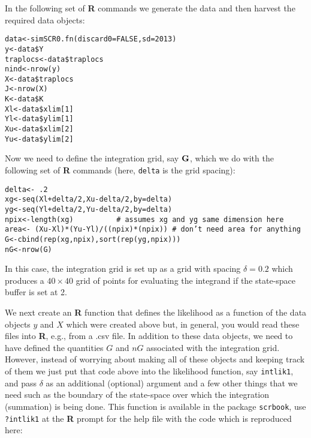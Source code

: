 In the following set of {\bf R} commands we generate the data and 
then harvest the required data objects:
{\small
\begin{verbatim}
data<-simSCR0.fn(discard0=FALSE,sd=2013)
y<-data$Y
traplocs<-data$traplocs
nind<-nrow(y)
X<-data$traplocs
J<-nrow(X)
K<-data$K
Xl<-data$xlim[1]
Yl<-data$ylim[1]
Xu<-data$xlim[2]
Yu<-data$ylim[2]
\end{verbatim}
}
Now we need to define the integration grid, say ${\bf G}$, which we do with
the following set of {\bf R} commands (here, \mbox{\tt delta} is the grid spacing):
{\small
\begin{verbatim}
delta<- .2
xg<-seq(Xl+delta/2,Xu-delta/2,by=delta) 
yg<-seq(Yl+delta/2,Yu-delta/2,by=delta) 
npix<-length(xg)          # assumes xg and yg same dimension here
area<- (Xu-Xl)*(Yu-Yl)/((npix)*(npix)) # don’t need area for anything
G<-cbind(rep(xg,npix),sort(rep(yg,npix)))
nG<-nrow(G)
\end{verbatim}
}
In this case, the integration grid is set up as a grid with spacing
$\delta = 0.2$ which produces a $40 \times 40$ grid of points for evaluating the
integrand if the state-space buffer is set at 2.

We next create an {\bf R} function that defines the likelihood as a function
of the data objects $y$ and $X$ which were created above but, in general,
you would read these files into {\bf R}, e.g., from a .csv file.
In addition to these data
objects, we need to have defined the  quantities $G$ and $nG$ associated
with the integration grid.
However, instead of worrying about making all of these objects and
keeping track of them we just put that code above into the likelihood
function, say \mbox{\tt intlik1}, and pass $\delta$ as an additional (optional) argument and a
few other things that we need such as the boundary of the state-space
over which the integration (summation) is being done. This function is
available in the package \mbox{\tt scrbook}, use {\tt ?intlik1} at the {\bf R} prompt for the help file with 
the code which is reproduced here:

